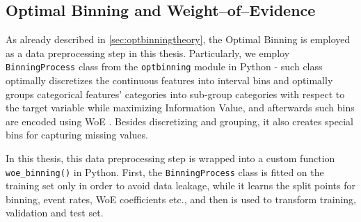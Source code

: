 \subsection{Optimal Binning and Weight--of--Evidence}
\label{subsec:prep-optbinning}
As already described in \autoref{sec:optbinningtheory}, the Optimal Binning is employed as a data preprocessing step in this thesis.
Particularly, we employ \lstinline{BinningProcess} class from the \lstinline{optbinning} module in Python - such class optimally discretizes the continuous features into interval bins and optimally groups categorical features' categories into sub-group categories with respect to the target variable while maximizing Information Value, and afterwards such bins are encoded using WoE \citep{navas2020optimal}. Besides discretizing and grouping, it also creates special bins for capturing missing values.



In this thesis, this data preprocessing step is wrapped into a custom function \lstinline{woe_binning()} in Python.
First, the  \lstinline{BinningProcess} class is fitted on the training set only in order to avoid data leakage, while it learns the split points for binning, event rates, WoE coefficients etc., and then is used to transform training, validation and test set.

